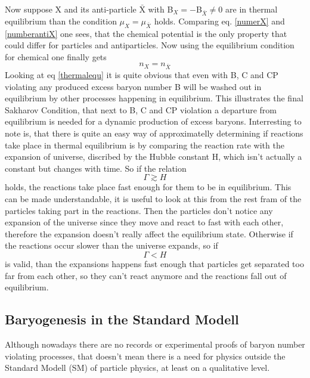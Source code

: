 Now suppose X and its anti-particle $\bar{\text{X}}$  with B$_X=-$B$_{\bar{X}}\neq0$ are in thermal equilibrium than the condition $\mu_X=\mu_{\bar{X}}$ holds. Comparing eq. \ref{numerX} and \ref{numberantiX} one sees, that the chemical potential is the only property that could differ for particles and antiparticles. Now using the equilibrium condition for chemical one finally gets
\begin{equation}
	n_X=n_{\bar{X}}
	\label{thermalequ}
\end{equation}
Looking at eq \ref{thermalequ} it is quite obvious that even with B, C and CP violating any produced excess baryon number B will be washed out in equilibrium by other processes happening in equilibrium. \newline
This illustrates the final Sakharov Condition, that next to B, C and CP violation a departure from equilibrium is needed for a dynamic production of excess baryons. \newline
Interresting to note is, that there is quite an easy way of approximatelly determining if reactions take place in thermal equilibrium is by comparing the reaction rate with the expansion of universe, discribed by the Hubble constant H, which isn't actually a constant but changes with time. So if the relation 
\begin{equation}
	\Gamma\gtrsim H
	\label{rate_g_hubble}
\end{equation}
holds, the reactions take place fast enough for them to be in equilibrium. This can be made understandable, it is useful to look at this from the rest fram of the particles taking part in the reactions. Then the particles don't notice any expansion of the universe since they move and react to fast with each other, therefore the expansion doesn't really affect the equilibrium state. \newline
Otherwise if the reactions occur slower than the universe expands, so if 
\begin{equation}
	\Gamma<H
\end{equation}
is valid, than the expansions happens fast enough that particles get separated too far from each other, so they can't react anymore and the reactions fall out of equilibrium.
\subsection{Baryogenesis in the Standard Modell}
Although nowadays there are no records or experimental proofs of baryon number violating processes, that doesn't mean there is a need for physics outside the Standard Modell (SM) of particle physics, at least on a qualitative level.
